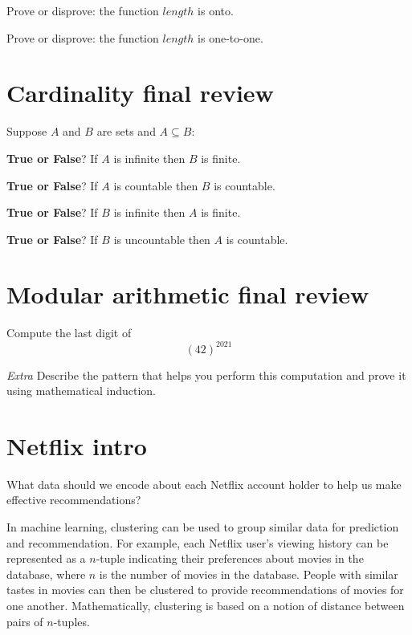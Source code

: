 \documentclass[12pt, oneside]{article}
\begin{document}
Prove or disprove: the function $length$ is onto.

\vfill

Prove or disprove: the function $length$ is one-to-one.

\vfill
 \vfill
\section*{Cardinality final review}


Suppose $A$ and $B$ are sets and $A \subseteq B$:

{\bf True or False}?  If $A$ is infinite then $B$ is finite.

\vspace{50pt}

{\bf True or False}?  If $A$ is countable then $B$ is countable.

\vspace{50pt}

{\bf True or False}?  If $B$ is infinite then $A$ is finite.

\vspace{50pt}

{\bf True or False}?  If $B$ is uncountable then $A$ is countable.

\vspace{50pt} \vfill
\section*{Modular arithmetic final review}


Compute the last digit of 
\[
    (42)^{2021}
\]

\vfill

{\it Extra} Describe the pattern that helps you perform this computation 
and prove it using mathematical induction. \vfill
\section*{Netflix intro}


What data should we encode about each Netflix account holder to help us make effective recommendations?

\vfill
\vfill

In machine learning, clustering can be used to group similar data for prediction and recommendation.  For example,
each Netflix user's viewing history can be represented as a $n$-tuple indicating their preferences about
movies in the database, where $n$ is the number of movies in the database.  People with similar tastes in movies can then be clustered to provide recommendations
of movies for one another.  Mathematically, clustering is based on a notion of distance between pairs of $n$-tuples.
 \vfill
\end{document}
